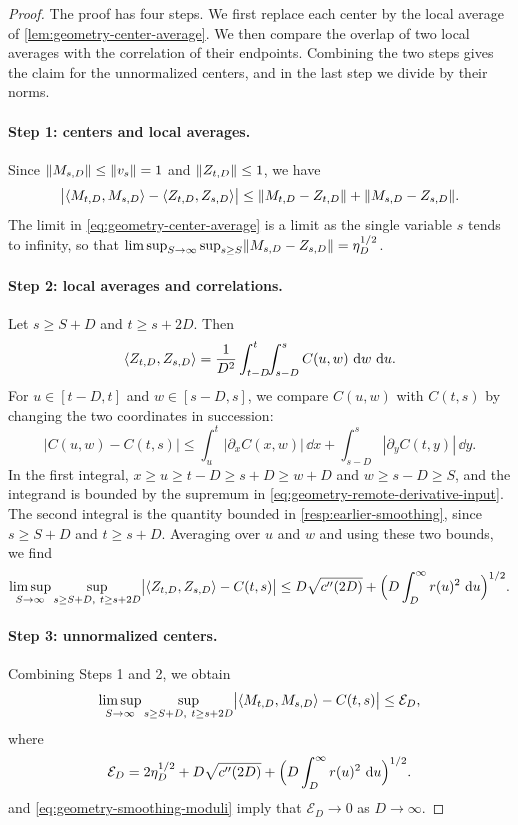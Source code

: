 \begin{proof}
The proof has four steps. We first replace each center by the local average of \cref{lem:geometry-center-average}. We then compare the overlap of two local averages with the correlation of their endpoints. Combining the two steps gives the claim for the unnormalized centers, and in the last step we divide by their norms.

\paragraph{Step 1: centers and local averages.}
Since $\lVert M_{s,D}\rVert\le\lVert v_s\rVert=1$ and $\lVert Z_{t,D}\rVert\le1$, we have
\[
 \bigl|\left\langle M_{t,D},M_{s,D}\right\rangle-\left\langle Z_{t,D},Z_{s,D}\right\rangle\bigr|
 \le\lVert M_{t,D}-Z_{t,D}\rVert+\lVert M_{s,D}-Z_{s,D}\rVert .
\]
The limit in \eqref{eq:geometry-center-average} is a limit as the single variable $s$ tends to infinity, so that $\limsup_{S\to\infty}\sup_{s\ge S}\lVert M_{s,D}-Z_{s,D}\rVert=\eta_D^{1/2}$.

\paragraph{Step 2: local averages and correlations.}
Let $s\ge S+D$ and $t\ge s+2D$. Then
\[
 \left\langle Z_{t,D},Z_{s,D}\right\rangle=\frac1{D^2}\int_{t-D}^t\!\!\int_{s-D}^sC(u,w)\,\mathop{}\!\mathrm d w\,\mathop{}\!\mathrm d u .
\]
For $u\in[t-D,t]$ and $w\in[s-D,s]$, we compare $C(u,w)$ with $C(t,s)$ by changing the two coordinates in succession:
\[
 |C(u,w)-C(t,s)|\le\int_u^t|\partial_xC(x,w)|\,\dd x+\int_{s-D}^s|\partial_yC(t,y)|\,\dd y .
\]
In the first integral, $x\ge u\ge t-D\ge s+D\ge w+D$ and $w\ge s-D\ge S$, and the integrand is bounded by the supremum in \eqref{eq:geometry-remote-derivative-input}. The second integral is the quantity bounded in \eqref{resp:earlier-smoothing}, since $s\ge S+D$ and $t\ge s+D$. Averaging over $u$ and $w$ and using these two bounds, we find
\[
 \limsup_{S\to\infty}\sup_{s\ge S+D,\ t\ge s+2D}\bigl|\left\langle Z_{t,D},Z_{s,D}\right\rangle-C(t,s)\bigr|
 \le D\sqrt{c''(2D)}+\Bigl(D\int_D^\infty r(u)^2\,\mathop{}\!\mathrm d u\Bigr)^{1/2}.
\]

\paragraph{Step 3: unnormalized centers.}
Combining Steps 1 and 2, we obtain
\begin{equation}\label{eq:geometry-unnormalized-gram}
 \limsup_{S\to\infty}\sup_{s\ge S+D,\ t\ge s+2D}\bigl|\left\langle M_{t,D},M_{s,D}\right\rangle-C(t,s)\bigr|\le\mathcal E_D,
\end{equation}
where
\[
 \mathcal E_D=2\eta_D^{1/2}+D\sqrt{c''(2D)}+\Bigl(D\int_D^\infty r(u)^2\,\mathop{}\!\mathrm d u\Bigr)^{1/2}.
\]
 and \eqref{eq:geometry-smoothing-moduli} imply that $\mathcal E_D\to0$ as $D\to\infty$.


\end{proof}
